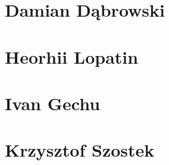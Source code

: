 \section{Damian Dąbrowski}
\section{Heorhii Lopatin}
\section{Ivan Gechu}
\section{Krzysztof Szostek}
